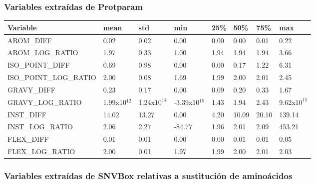 \subsubsection{Variables extraídas de Protparam}
\begin{longtable}{|l|l|l|l|l|l|l|l|}
\hline
Variable & mean             & std                & min                  & 25\% & 50\%  & 75\%  & max                 \\ \hline
\endfirsthead
%
\endhead
%
AROM\_DIFF              & 0.02             & 0.02               & 0.00                 & 0.00 & 0.00  & 0.01  & 0.22                \\ \hline
AROM\_LOG\_RATIO        & 1.97             & 0.33               & 1.00                 & 1.94 & 1.94  & 1.94  & 3.66                \\ \hline
ISO\_POINT\_DIFF       & 0.69             & 0.98               & 0.00                 & 0.00 & 0.17  & 1.22  & 6.31                \\ \hline
ISO\_POINT\_LOG\_RATIO & 2.00             & 0.08               & 1.69                 & 1.99 & 2.00  & 2.01  & 2.45                \\ \hline
GRAVY\_DIFF                    & 0.23             & 0.17               & 0.00                 & 0.09 & 0.20  & 0.33  & 1.67                \\ 
\hline
GRAVY\_LOG\_RATIO & 1.99x10$^{12}$ & 1.24x$10^{14}$ & -3.39x10$^{15}$ & 1.43 & 1.94 & 2.43 & 9.62x$10^{15}$ \\
\hline
INST\_DIFF       & 14.02            & 13.27              & 0.00                 & 4.20 & 10.09 & 20.10 & 139.14              \\ \hline
INST\_LOG\_RATIO & 2.06             & 2.27               & -84.77               & 1.96 & 2.01  & 2.09  & 453.21              \\ \hline
FLEX\_DIFF              & 0.01             & 0.01               & 0.00                 & 0.00 & 0.01  & 0.01  & 0.05                \\ \hline
FLEX\_LOG\_RATIO        & 2.00             & 0.01               & 1.97                 & 1.99 & 2.00  & 2.01  & 2.03                \\ \hline
\end{longtable}

\newpage

\subsubsection{Variables extraídas de SNVBox relativas a sustitución de aminoácidos}

